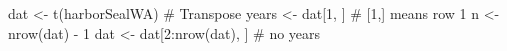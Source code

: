 \begin{Schunk}
\begin{Sinput}
 dat <- t(harborSealWA) # Transpose
 years <- dat[1, ] # [1,] means row 1
 n <- nrow(dat) - 1
 dat <- dat[2:nrow(dat), ] # no years
\end{Sinput}
\end{Schunk}
